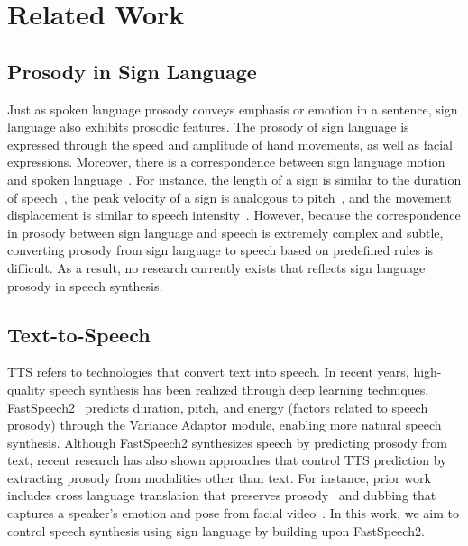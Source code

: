 \section{Related Work}
\label{sec:related_work}
\subsection{Prosody in Sign Language}
Just as spoken language prosody conveys emphasis or emotion in a sentence, sign language also exhibits prosodic features. The prosody of sign language is expressed through  the speed and amplitude of hand movements, as well as facial expressions. Moreover, there is a correspondence between sign language motion and spoken language~\cite{Brentari2015The}. For instance, the length of a sign is similar to the duration of speech~\cite{Wilbur1999}, the peak velocity of a sign is analogous to pitch~\cite{Limousin2010}, and the movement displacement is similar to speech intensity~\cite{Wilbur1999}. However, because the correspondence in prosody between sign language and speech is extremely complex and subtle, converting prosody from sign language to speech based on predefined rules is difficult. As a result, no research currently exists that reflects sign language prosody in speech synthesis.

\subsection{Text-to-Speech}
TTS refers to technologies that convert text into speech. In recent years, high-quality speech synthesis has been realized through deep learning techniques. FastSpeech2~\cite{ren2021fastspeech} predicts duration, pitch, and energy (factors related to speech prosody) through the Variance Adaptor module, enabling more natural speech synthesis. Although FastSpeech2 synthesizes speech by predicting prosody from text, recent research has also shown approaches that control TTS prediction by extracting prosody from modalities other than text.
For instance, prior work includes cross language translation that preserves prosody~\cite{swiatkowski23_interspeech} and dubbing that captures a speaker’s emotion and pose from facial video~\cite{yang23c_interspeech}.
In this work, we aim to control speech synthesis using sign language by building upon FastSpeech2.

